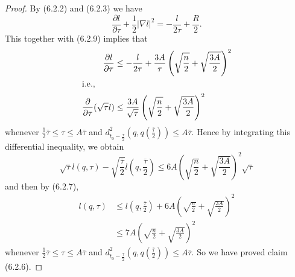 \begin{proof}
By (6.2.2) and (6.2.3) we have
$$
\frac{\partial l}{\partial \tau}+\frac{1}{2}|\nabla
l|^2=-\frac{l}{2\tau}+\frac{R}{2}.
$$
This together with (6.2.9) implies that
\begin{align*}
\frac{\partial l}{\partial \tau} &\leq
-\frac{l}{2\tau}+\frac{3A}{\tau}
\left(\sqrt{\frac{n}{2}}+\sqrt{\frac{3A}{2}}\right)^2 \\
\intertext{i.e.,} \frac{\partial}{\partial\tau}(\sqrt{\tau}l)
&\leq\frac{3A}{\sqrt{\tau}}\left(\sqrt{\frac{n}{2}}+\sqrt{\frac{3A}{2}}\right)^2
\end{align*}
whenever $\frac{1}{2}\bar{\tau}\leq \tau \leq A\bar{\tau}$ and
$d_{t_0-\frac{\bar{\tau}}{2}}^2
\left(q,q\left(\frac{\bar{\tau}}{2}\right)\right)\leq A\bar{\tau}.$ Hence by
integrating this differential inequality, we obtain
$$
\sqrt{\tau}l(q,\tau)-\sqrt{\frac{\bar{\tau}}{2}}l\left(q,\frac{\bar{\tau}}{2}\right)
\leq 6A\left(\sqrt{\frac{n}{2}}+\sqrt{\frac{3A}{2}}\right)^2\sqrt{\tau}
$$
and then by (6.2.7),
\begin{align}
l(q,\tau)&  \leq
l\left(q,\frac{\bar{\tau}}{2}\right)+6A\left(\sqrt{\frac{n}{2}}+\sqrt{\frac{3A}{2}}\right)^2\\
&  \leq 7A\left(\sqrt{\frac{n}{2}}+\sqrt{\frac{3A}{2}}\right)^2 \nonumber
\end{align}  %
whenever $\frac{1}{2}\bar{\tau}\leq \tau \leq A\bar{\tau}$ and
$d_{t_0-\frac{\bar{\tau}}{2}}^2 (q,q(\frac{\bar{\tau}}{2}))\leq
A\bar{\tau}.$  So we have proved claim (6.2.6).
\end{proof}

